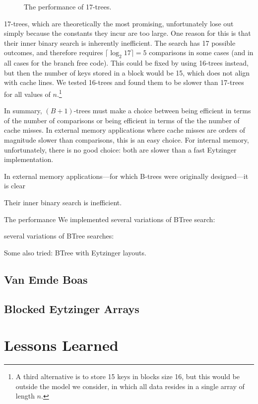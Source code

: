 \documentclass{patmorin}
\begin{document}
\begin{figure}
   \caption{The performance of 17-trees.}
\end{figure}

17-trees, which are theoretically the most promising, unfortunately lose
out simply because the constants they incur are too large.  One reason
for this is that their inner binary search is inherently inefficient. The
search has 17 possible outcomes, and therefore requires $\lceil\log_2
17\rceil=5$ comparisons in some cases (and in all cases for the branch
free code).  This could be fixed by using 16-trees instead, but then the
number of keys stored in a block would be 15, which does not align with
cache lines.  We tested 16-trees and found them to be slower than 17-trees
for all values of $n$.\footnote{A third alternative is to store 15 keys
in blocks size 16, but this would be outside the model we consider,
in which all data resides in a single array of length $n$.}

In summary, $(B+1)$-trees must make a choice between being efficient in
terms of the number of comparisons or being efficient in terms of the
the number of cache misses.  In external memory applications where cache
misses are orders of magnitude slower than comparisons, this is an easy
choice. For internal memory, unfortunately, there is no good choice:
both are slower than a fast Eytzinger implementation.


In external memory applications---for which B-trees were originally designed---it is clear


Their inner binary search is inefficient.


The performance
We implemented several variations of BTree search:

several variations of BTree searches:

Some also tried:  BTree with Eytzinger layouts.

\subsection{Van Emde Boas}


\subsection{Blocked Eytzinger Arrays}


\section{Lessons Learned}
\end{document}
